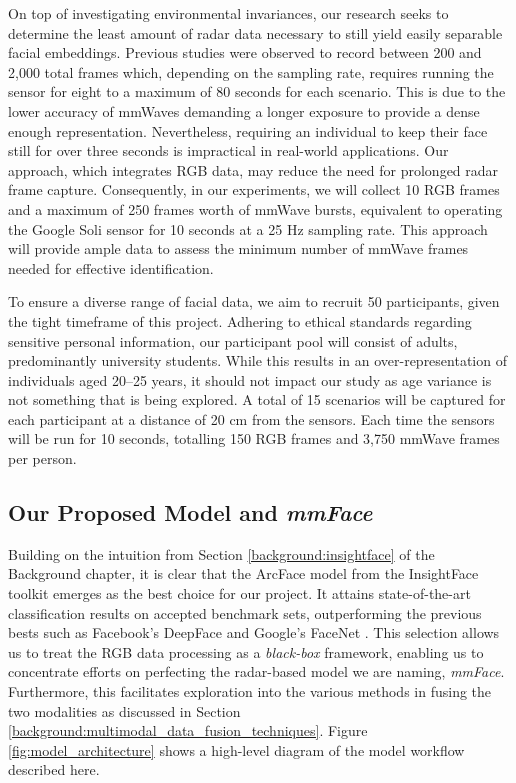 \documentclass{interim}
\begin{document}
On top of investigating environmental invariances, our research seeks to determine the least amount of radar data necessary to still yield easily separable facial embeddings. Previous studies were observed to record between 200 and 2,000 total frames which, depending on the sampling rate, requires running the sensor for eight to a maximum of 80 seconds for each scenario. This is due to the lower accuracy of mmWaves demanding a longer exposure to provide a dense enough representation. Nevertheless, requiring an individual to keep their face still for over three seconds is impractical in real-world applications. Our approach, which integrates RGB data, may reduce the need for prolonged radar frame capture. Consequently, in our experiments, we will collect 10 RGB frames and a maximum of 250 frames worth of mmWave bursts, equivalent to operating the Google Soli sensor for 10 seconds at a 25 Hz sampling rate. This approach will provide ample data to assess the minimum number of mmWave frames needed for effective identification. 

To ensure a diverse range of facial data, we aim to recruit 50 participants, given the tight timeframe of this project. Adhering to ethical standards regarding sensitive personal information, our participant pool will consist of adults, predominantly university students. While this results in an over-representation of individuals aged 20--25 years, it should not impact our study as age variance is not something that is being explored. A total of 15 scenarios will be captured for each participant at a distance of 20 cm from the sensors. Each time the sensors will be run for 10 seconds, totalling 150 RGB frames and 3,750 mmWave frames per person.


\subsection{Our Proposed Model and \textit{mmFace}}
Building on the intuition from Section \ref{background:insightface} of the Background chapter, it is clear that the ArcFace model from the InsightFace toolkit emerges as the best choice for our project. It attains state-of-the-art classification results on accepted benchmark sets, outperforming the previous bests such as Facebook's DeepFace \cite{taigman2014deepface} and Google's FaceNet \cite{schroff2015facenet}. This selection allows us to treat the RGB data processing as a \textit{black-box} framework, enabling us to concentrate efforts on perfecting the radar-based model we are naming, \textit{mmFace}. Furthermore, this facilitates exploration into the various methods in fusing the two modalities as discussed in Section \ref{background:multimodal_data_fusion_techniques}. Figure \ref{fig:model_architecture} shows a high-level diagram of the model workflow described here. 
\end{document}
